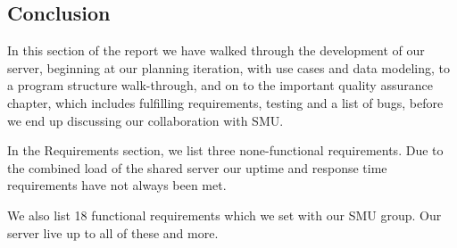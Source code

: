 \subsection{Conclusion}
In this section of the report we have walked through the development of our server, beginning at our planning iteration, with use cases and data modeling, to a program structure walk-through, and on to the important quality assurance chapter, which includes fulfilling requirements, testing and a list of bugs, before we end up discussing our collaboration with SMU.

In the Requirements section, we list three none-functional requirements. Due to the combined load of the shared server our uptime and response time requirements have not always been met.

We also list 18 functional requirements which we set with our SMU group. Our server live up to all of these and more.
\newpage